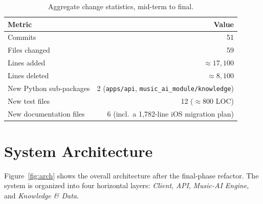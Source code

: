 \documentclass[11pt,a4paper]{article}
\begin{document}
\begin{table}[h]
\centering
\caption{Aggregate change statistics, mid-term to final.}
\begin{tabular}{lr}
\toprule
\textbf{Metric} & \textbf{Value}\\
\midrule
Commits                & 51 \\
Files changed          & 59 \\
Lines added            & $\approx 17{,}100$ \\
Lines deleted          & $\approx 8{,}100$ \\
New Python sub-packages & 2 (\texttt{apps/api}, \texttt{music\_ai\_module/knowledge}) \\
New test files         & 12 ($\approx 800$ LOC) \\
New documentation files & 6 (incl.\ a 1{,}782-line iOS migration plan) \\
\bottomrule
\end{tabular}
\end{table}

\section{System Architecture}

Figure~\ref{fig:arch} shows the overall architecture after the final-phase
refactor. The system is organized into four horizontal layers: \emph{Client},
\emph{API}, \emph{Music-AI Engine}, and \emph{Knowledge \& Data}.
\end{document}
